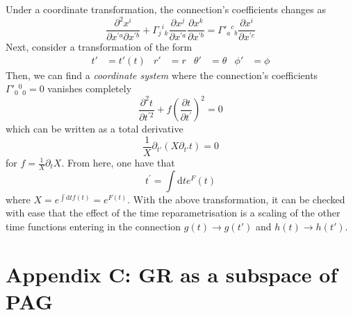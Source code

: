 \documentclass[10pt,a4paper]{article}
\begin{document}
Under a coordinate transformation, the connection's coefficients changes as
\begin{equation}
  \frac{\partial^2 x^i}{\partial x^{'a}\partial x^{'b}} + \Gamma_{j}{}^{i}{}_{k}\frac{\partial x^j}{\partial x^{'a}}\frac{\partial x^k}{\partial x^{'b}} 
  = \Gamma'_{a}{}^{c}{}_{b}\frac{\partial x^i}{\partial x^{'c}}
\end{equation}
Next, consider a transformation of the form
\begin{align}
  t' & = t'(t) & r' & = r & \theta ' & = \theta & \phi' & = \phi
\end{align}
Then, we can find a \textit{coordinate system} where the connection's coefficients $\Gamma'_{0}{}^{0}{}_{0} = 0$ vanishes completely
\begin{equation}
  \frac{\partial^2 t}{\partial t^{'2}} + f \left(\frac{\partial t}{\partial t^{'}}\right)^2 = 0
\end{equation}
which can be written as a total derivative
\begin{equation}
  \frac{1}{X}\partial_{t'}\left(X \partial_{t'}t\right) = 0
\end{equation}
for $f = \frac{1}{X}\partial_t X$. From here, one have that
\begin{equation}
  t^{'} = \int \mathrm{d}t e^F(t)
\end{equation}
where $X = e^{\int \mathrm{d}t f(t)} = e^{F(t)}$. With the above transformation, it can be checked with ease that the effect of the time
reparametrisation is a scaling of the other time functions entering in the connection $g(t) \to g(t')$ and $h(t) \to h(t')$.


\section{Appendix C: GR as a subspace of PAG}
\end{document}
